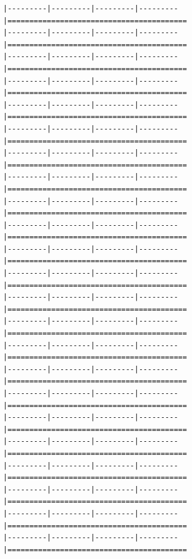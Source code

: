 \documentclass[
]{article}
\begin{document}
\begin{verbatim}
|---------|---------|---------|---------|=========================================                                          |---------|---------|---------|---------|=========================================                                          |---------|---------|---------|---------|=========================================                                          |---------|---------|---------|---------|=========================================                                          |---------|---------|---------|---------|=========================================                                          |---------|---------|---------|---------|=========================================                                          |---------|---------|---------|---------|=========================================                                          |---------|---------|---------|---------|=========================================                                          |---------|---------|---------|---------|=========================================                                          |---------|---------|---------|---------|=========================================                                          |---------|---------|---------|---------|=========================================                                          |---------|---------|---------|---------|=========================================                                          |---------|---------|---------|---------|=========================================                                          |---------|---------|---------|---------|=========================================                                          |---------|---------|---------|---------|=========================================                                          |---------|---------|---------|---------|=========================================                                          |---------|---------|---------|---------|=========================================                                          |---------|---------|---------|---------|=========================================                                          |---------|---------|---------|---------|=========================================                                          |---------|---------|---------|---------|=========================================                                          |---------|---------|---------|---------|=========================================                                          |---------|---------|---------|---------|=========================================                                          |---------|---------|---------|---------|=========================================                                          
\end{verbatim}
\end{document}
